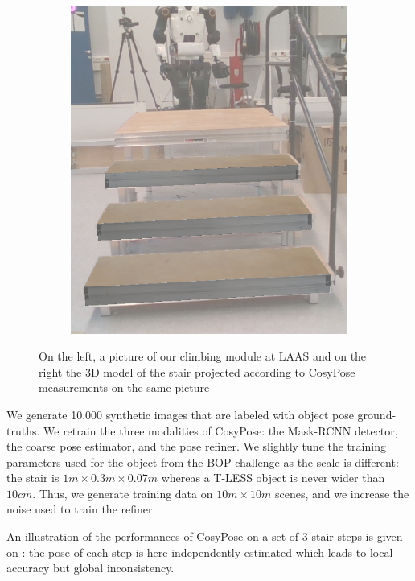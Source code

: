 \begin{figure}[h]
\begin{subfigure}[]{{.33\linewidth}}
        \includegraphics[width=\textwidth]{figures/cosyslam/0006_proj.png} 
    \end{subfigure}
    \caption{On the left, a picture of our climbing module at LAAS and on the right the 3D model of the stair projected according to CosyPose measurements on the same picture}%
    \label{fig:cosypose-ycbv}%
\end{figure}

We generate 10.000 synthetic images that are labeled with object pose ground-truths. We retrain the three modalities of CosyPose: 
the Mask-RCNN detector, the coarse pose estimator, and the pose refiner. We slightly tune the training parameters used for the object from the BOP challenge as 
the scale is different: the stair is $1m \times 0.3m \times 0.07m$ whereas a T-LESS object is never wider than $10cm$. 
Thus, we generate training data on $10m \times 10m$ scenes, and we increase the noise used to train the refiner.  

An illustration of the performances of CosyPose on a set of 3 stair steps is given on : 
the pose of each step is here independently estimated which leads to local accuracy but global inconsistency. 



